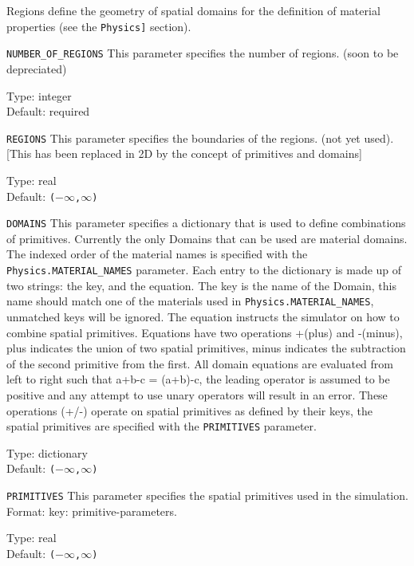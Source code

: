 Regions define the geometry of spatial domains for the definition of material
properties (see the \texttt{Physics]} section).

\begin{keydescription}{\texttt{NUMBER\_OF\_REGIONS}}
This parameter specifies the number of regions. (soon to be depreciated)
\begin{keytab}
   Type:    \> integer \\
   Default: \> required
\end{keytab}
\end{keydescription}

\begin{keydescription}{\texttt{REGIONS}}
This parameter specifies the boundaries of the regions. (not yet used). [This has been replaced 
in 2D by the concept of primitives and domains]
\begin{keytab}
   Type:    \> real \\
   Default: \> \texttt{($-\infty$,$\infty$)}
\end{keytab}
\end{keydescription}

\begin{keydescription}{\texttt{DOMAINS}}
This parameter specifies a dictionary that is used to define combinations of primitives. 
Currently the only Domains that can be used are material domains. The indexed order of the 
material names is specified with the \texttt{Physics.MATERIAL\_NAMES} parameter. Each entry to 
the dictionary is made up of two strings: the key, and the equation. The key is the name of the 
Domain, this name should match one of the materials used in  \texttt{Physics.MATERIAL\_NAMES}, 
unmatched keys will be ignored. The equation instructs the simulator on how to combine spatial primitives. Equations have two operations +(plus) and -(minus), plus indicates the union of two 
spatial primitives, minus indicates the subtraction of the second primitive from the first. All 
domain equations are evaluated from left to right such that a+b-c = (a+b)-c, the leading 
operator is assumed to be positive and any attempt to use unary operators will result in an 
error. These operations (+/-) operate on spatial primitives as defined by their keys, 
the spatial primitives are specified with the \texttt{PRIMITIVES} parameter.  
\begin{keytab}
   Type:    \> dictionary \\
   Default: \> \texttt{($-\infty$,$\infty$)}
\end{keytab}
\end{keydescription}

\begin{keydescription}{\texttt{PRIMITIVES}}
This parameter specifies the spatial primitives used in the simulation. Format: key: primitive-parameters.
\begin{keytab}
   Type:    \> real \\
   Default: \> \texttt{($-\infty$,$\infty$)}
\end{keytab}
\end{keydescription}
